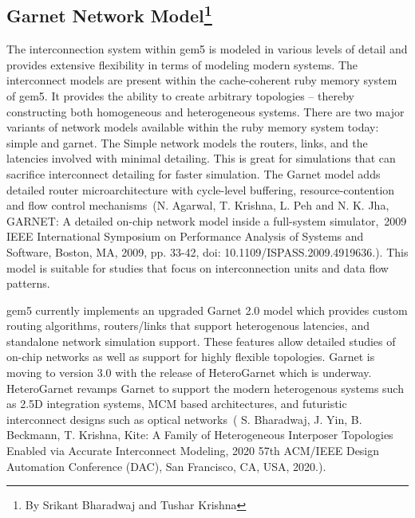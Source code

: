 \subsection[Garnet Network Model]{Garnet Network Model\footnote{By Srikant Bharadwaj and Tushar Krishna}}
\label{sec:garnet}

The interconnection system within gem5 is modeled in various levels of detail and provides extensive
flexibility in terms of modeling modern systems.
The interconnect models are present within the cache-coherent ruby memory system of gem5.
It provides the ability to create arbitrary topologies – thereby constructing both homogeneous and heterogeneous systems.
There are two major variants of network models available within the ruby memory system today: simple and garnet.
The Simple network models the routers, links, and the latencies involved with minimal detailing.
This is great for simulations that can sacrifice interconnect detailing for faster simulation.
The Garnet model adds detailed router microarchitecture with cycle-level buffering, resource-contention and flow control mechanisms~\cite{}(N. Agarwal, T. Krishna, L. Peh and N. K. Jha, GARNET: A detailed on-chip network model inside a full-system simulator, 2009 IEEE International Symposium on Performance Analysis of Systems and Software, Boston, MA, 2009, pp. 33-42, doi: 10.1109/ISPASS.2009.4919636.).
This model is suitable for studies that focus on interconnection units and data flow patterns.

gem5 currently implements an upgraded Garnet 2.0 model which provides custom routing algorithms, routers/links that support heterogenous latencies, and standalone network simulation support.
These features allow detailed studies of on-chip networks as well as support for highly flexible topologies.
Garnet is moving to version 3.0 with the release of HeteroGarnet which is underway.
HeteroGarnet revamps Garnet to support the modern heterogenous systems such as 2.5D integration systems, MCM based architectures, and futuristic interconnect designs such as optical networks~\cite{}( S. Bharadwaj, J. Yin, B. Beckmann, T. Krishna, Kite: A Family of Heterogeneous Interposer Topologies Enabled via Accurate Interconnect Modeling, 2020 57th ACM/IEEE Design Automation Conference (DAC), San Francisco, CA, USA, 2020.).
